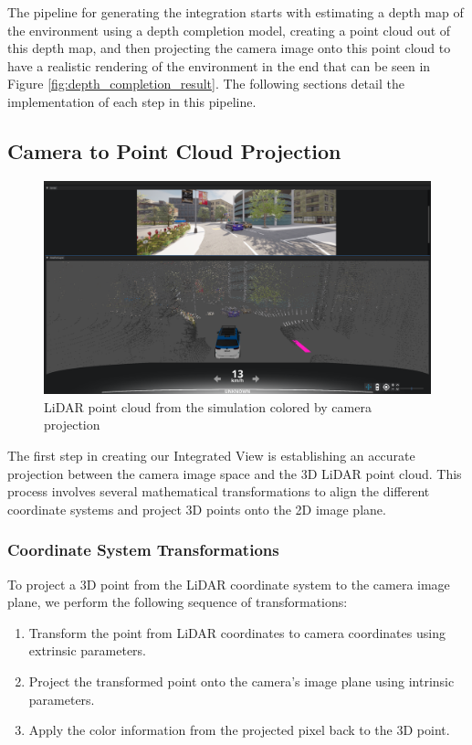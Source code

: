 The pipeline for generating the integration starts with estimating a depth map of the environment using a depth completion model, creating a point cloud out of this depth map, and then projecting the camera image onto this point cloud to have a realistic rendering of the environment in the end that can be seen in Figure \ref{fig:depth_completion_result}. The following sections detail the implementation of each step in this pipeline.

\subsection{Camera to Point Cloud Projection}

\begin{figure}
    \centering
    \includegraphics[width=\textwidth, trim=0 150pt 0 50pt, clip]{figures/pc.png}
    \caption{\ac{LiDAR} point cloud from the simulation colored by camera projection}
    \label{fig:camera_projection}
\end{figure}

The first step in creating our Integrated View is establishing an accurate projection between the camera image space and the 3D \ac{LiDAR} point cloud. This process involves several mathematical transformations to align the different coordinate systems and project 3D points onto the 2D image plane.

\subsubsection{Coordinate System Transformations}

To project a 3D point from the \ac{LiDAR} coordinate system to the camera image plane, we perform the following sequence of transformations:
\begin{enumerate}
    \item Transform the point from \ac{LiDAR} coordinates to camera coordinates using extrinsic parameters.
    \item Project the transformed point onto the camera's image plane using intrinsic parameters.
    \item Apply the color information from the projected pixel back to the 3D point.
\end{enumerate}

